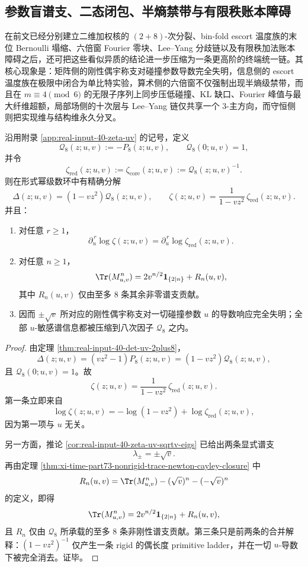 \subsection{参数盲谱支、二态闭包、半熵禁带与有限秩账本障碍}\label{subsec:conclusion-parameterblind-binaryclosure-halfentropy-ledger-obstruction}
在前文已经分别建立二维加权核的 \((2+8)\)-次分裂、bin-fold escort 温度族的末位 Bernoulli 塌缩、六倍窗 Fourier 零块、Lee--Yang 分歧链以及有限秩加法账本障碍之后，还可把这些看似异质的结论进一步压缩为一条更高阶的终端统一链。其核心现象是：矩阵侧的刚性偶宇称支对碰撞参数导数完全失明，信息侧的 escort 温度族在极限中闭合为单比特实验，算术侧的六倍窗不仅强制出现半熵级禁带，而且在 \(m\equiv 4\pmod 6\) 的无限子序列上同步压低碰撞、KL 缺口、Fourier 峰值与最大纤维超额，局部场侧的十次层与 Lee--Yang 链仅共享一个 \(3\)-主方向，而守恒侧则把实现维与结构维永久分叉。

\begin{theorem}[参数盲偶宇称支分解]\label{thm:conclusion-parameterblind-even-parity-splitting}
沿用附录 \ref{app:real-input-40-zeta-uv} 的记号，定义
\[
\mathcal Q_8(z;u,v):=-P_8(z;u,v),
\qquad
\mathcal Q_8(0;u,v)=1,
\]
并令
\[
\zeta_{\mathrm{red}}(z;u,v):=\zeta_{\mathrm{core}}(z;u,v):=\mathcal Q_8(z;u,v)^{-1}.
\]
则在形式幂级数环中有精确分解
\[
\Delta(z;u,v)=(1-vz^2)\mathcal Q_8(z;u,v),
\qquad
\zeta(z;u,v)=\frac{1}{1-vz^2}\,\zeta_{\mathrm{red}}(z;u,v).
\]
并且：
\begin{enumerate}
  \item 对任意 \(r\ge 1\)，
  \[
  \partial_u^{\,r}\log\zeta(z;u,v)=\partial_u^{\,r}\log\zeta_{\mathrm{red}}(z;u,v).
  \]
  \item 对任意 \(n\ge 1\)，
  \[
  \Tr(M_{u,v}^n)=2v^{n/2}\mathbf 1_{\{2\mid n\}}+R_n(u,v),
  \]
  其中 \(R_n(u,v)\) 仅由至多 \(8\) 条其余非零谱支贡献。
  \item 因而 \(\pm\sqrt v\) 所对应的刚性偶宇称支对一切碰撞参数 \(u\) 的导数响应完全失明；全部 \(u\)-敏感谱信息都被压缩到八次因子 \(\mathcal Q_8\) 之内。
\end{enumerate}
\end{theorem}
\begin{proof}
由定理 \ref{thm:real-input-40-det-uv-2plus8}，
\[
\Delta(z;u,v)=(vz^2-1)P_8(z;u,v)=(1-vz^2)\mathcal Q_8(z;u,v),
\]
且 \(\mathcal Q_8(0;u,v)=1\)。故
\[
\zeta(z;u,v)=\frac{1}{1-vz^2}\,\zeta_{\mathrm{red}}(z;u,v).
\]
第一条立即来自
\[
\log\zeta(z;u,v)=-\log(1-vz^2)+\log\zeta_{\mathrm{red}}(z;u,v),
\]
因为第一项与 \(u\) 无关。

另一方面，推论 \ref{cor:real-input-40-zeta-uv-sqrtv-eigs} 已给出两条显式谱支
\[
\lambda_\pm=\pm\sqrt v.
\]
再由定理 \ref{thm:xi-time-part73-nonrigid-trace-newton-cayley-closure} 中
\[
R_n(u,v)=\Tr(M_{u,v}^n)-(\sqrt v)^n-(-\sqrt v)^n
\]
的定义，即得
\[
\Tr(M_{u,v}^n)=2v^{n/2}\mathbf 1_{\{2\mid n\}}+R_n(u,v),
\]
且 \(R_n\) 仅由 \(\mathcal Q_8\) 所承载的至多 \(8\) 条非刚性谱支贡献。第三条只是前两条的合并解释：\((1-vz^2)^{-1}\) 仅产生一条 rigid 的偶长度 primitive ladder，并在一切 \(u\)-导数下被完全消去。证毕。
\end{proof}

